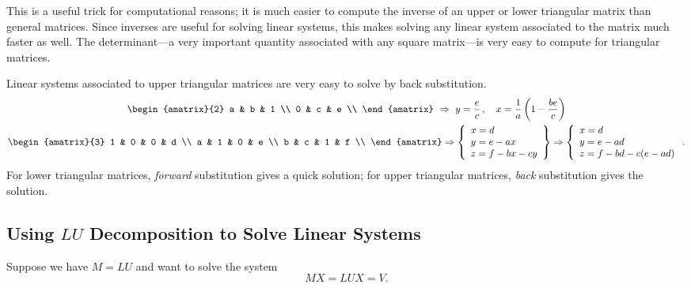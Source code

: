 This is a useful trick for  computational reasons; it is much easier to compute the inverse of an upper or lower triangular matrix than general matrices.  Since inverses are useful for solving linear systems, this makes solving any linear system associated to the matrix much faster as well.  The determinant---a very important quantity associated with any square matrix---is very easy to compute for triangular matrices.

\begin{example}
Linear systems associated to upper triangular matrices are very easy to solve by back substitution.
\begin{gather*}
\begin{amatrix}{2}
a & b & 1 \\
0 & c & e \\
\end{amatrix} \ \Rightarrow \ y=\frac{e}{c}\, , \quad x=\frac{1}{a}\left(1-\frac{be}{c}\right)\\
\begin{amatrix}{3}
1 & 0 & 0 & d \\
a & 1 & 0 & e \\
b & c & 1 & f \\
\end{amatrix} 
\Rightarrow 
\left\{    \begin{array}{l} x=d\\   y=e-ax\\  z=f-bx-cy \end{array} \right\}
\Rightarrow 
\left\{    \begin{array}{l} x=d\\   y=e-ad\\  z=f-bd-c(e-ad) \end{array} \right. .
\end{gather*}
For lower triangular matrices, 
\emph{forward} substitution 
gives a quick solution; for upper triangular matrices, 
\emph{back} substitution 
gives the solution.
\end{example}





\subsection{Using $LU$ Decomposition to Solve Linear Systems}

Suppose we have $M=LU$ and want to solve the system
\[
MX=LUX=V.
\]

